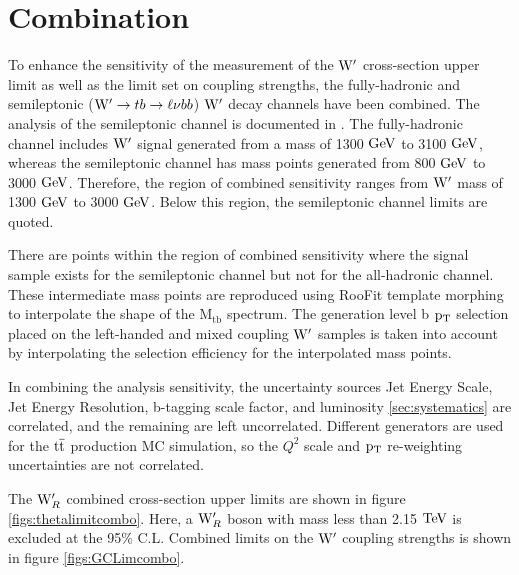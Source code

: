 \section{Combination}
\label{sec:combo}
To enhance the sensitivity of the measurement of the $\mathrm{W}^\prime$ cross-section upper limit as well as the limit set on coupling strengths, the fully-hadronic and 
semileptonic ($\mathrm{W}^\prime \to tb \to \ell\nu bb$) $\mathrm{W}^\prime$ decay channels have been combined.  
The analysis of the semileptonic channel is documented in \cite{Chatrchyan:2014koa}.  The fully-hadronic channel includes $\mathrm{W}^\prime$ signal generated from a 
mass of 1300 $\mathrm{GeV}$ to 3100 $\mathrm{GeV}$, whereas the semileptonic channel has mass points generated from 800 $\mathrm{GeV}$ to 3000 $\mathrm{GeV}$.  Therefore, the region of 
combined sensitivity ranges from $\mathrm{W}^\prime$ mass of 1300 $\mathrm{GeV}$ to 3000 $\mathrm{GeV}$.  Below this region, the semileptonic channel limits are quoted.  

There are points within the region of combined sensitivity where the signal sample exists for the semileptonic channel but not for the all-hadronic channel.  These 
intermediate mass points are reproduced using RooFit template morphing to interpolate the shape of the $\mathrm{M_{tb}}$ spectrum.  
The generation level b $\mathrm{p_{T}}$ selection placed on the left-handed and mixed coupling $\mathrm{W}^\prime$ samples is taken into account by interpolating the 
selection efficiency for the interpolated mass points.

In combining the analysis sensitivity, the uncertainty sources Jet Energy Scale, 
Jet Energy Resolution, b-tagging scale factor, and luminosity \ref{sec:systematics} are correlated, and the remaining are left uncorrelated.  
Different generators are used for the $\mathrm{t\overline{t}}$ production MC simulation, so the $Q^2$ scale and $\mathrm{p_{T}}$ re-weighting uncertainties are not correlated.

The $\mathrm{W}^\prime_{R}$ combined cross-section upper limits are shown in figure \ref{figs:thetalimitcombo}.  Here, a $\mathrm{W}^\prime_{R}$ boson with mass less than 2.15 $\mathrm{TeV}$ is excluded at the 95\% C.L.  
Combined limits on the $\mathrm{W}^\prime$ coupling strengths is shown in figure \ref{figs:GCLimcombo}.

